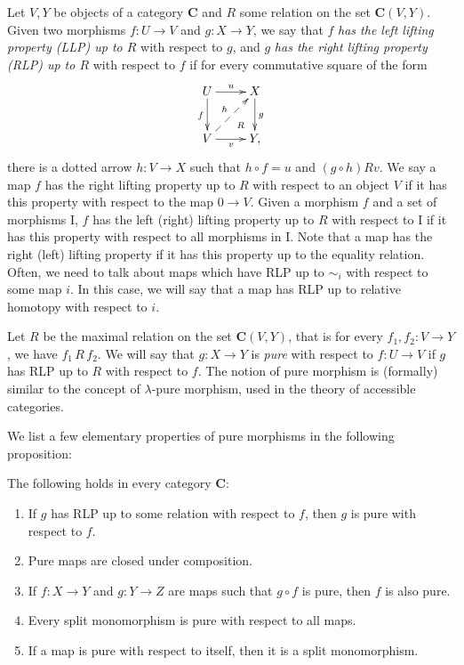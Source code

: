\documentclass{tac}
\theoremstyle{definition}
\newcommand{\cat}[1]{\mathbf{#1}}
\newcommand{\C}{\cat{C}}
\newcommand{\I}{\mathrm{I}}
\begin{document}
Let $V,Y$ be objects of a category $\C$ and $R$ some relation on the set $\C(V,Y)$.
Given two morphisms $f : U \to V$ and $g : X \to Y$, we say that $f$ \emph{has the left lifting property (LLP) up to $R$} with respect to $g$,
and $g$ \emph{has the right lifting property (RLP) up to $R$} with respect to $f$ if for every commutative square of the form
\[ \xymatrix{ U \ar[r]^u \ar@{}[dr]|(.7){R} \ar[d]_f & X \ar[d]^g \\
              V \ar[r]_v \ar@{-->}[ur]^h             & Y,
            } \]
there is a dotted arrow $h : V \to X$ such that $h \circ f = u$ and $(g \circ h) R v$.
We say a map $f$ has the right lifting property up to $R$ with respect to
an object $V$ if it has this property with respect to the map $0 \to V$.
Given a morphism $f$ and a set of morphisms $\I$, $f$ has the left (right) lifting property up to $R$
with respect to $\I$ if it has this property with respect to all morphisms in $\I$.
Note that a map has the right (left) lifting property if it has this property up to the equality relation.
Often, we need to talk about maps which have RLP up to $\sim_i$ with respect to some map $i$.
In this case, we will say that a map has RLP up to relative homotopy with respect to $i$.

Let $R$ be the maximal relation on the set $\C(V,Y)$, that is for every $f_1,f_2 : V \to Y$, we have $f_1\,R\,f_2$.
We will say that $g : X \to Y$ is \emph{pure} with respect to $f : U \to V$ if $g$ has RLP up to $R$ with respect to $f$.
The notion of pure morphism is (formally) similar to the concept of
$\lambda$-pure morphism, used in the theory of accessible categories.

We list a few elementary properties of pure morphisms in the following proposition:

\begin{prop} The following holds in every category $\C$:
\begin{enumerate}
\item If $g$ has RLP up to some relation with respect to $f$, then $g$ is pure with respect to $f$.
\item Pure maps are closed under composition.
\item If $f : X \to Y$ and $g : Y \to Z$ are maps such that $g \circ f$ is pure, then $f$ is also pure.
\item Every split monomorphism is pure with respect to all maps.
\item If a map is pure with respect to itself, then it is a split monomorphism.
\end{enumerate}
\end{prop}
\end{document}
